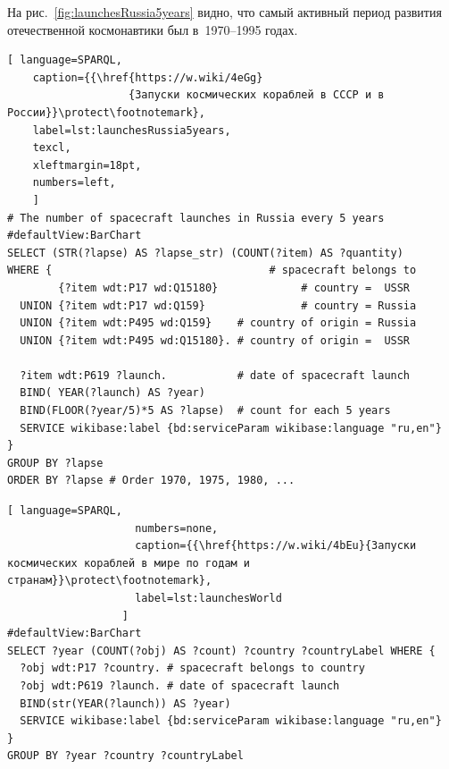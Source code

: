 На рис.~\ref{fig:launchesRussia5years} видно, 
что самый активный период развития отечественной космонавтики был в~1970--1995 годах.



\newpage


\begin{lstlisting}[ language=SPARQL, 
    caption={{\href{https://w.wiki/4eGg}
                   {Запуски космических кораблей в СССР и в России}}\protect\footnotemark}, 
    label=lst:launchesRussia5years,
    texcl,
    xleftmargin=18pt, 
    numbers=left,
    ]
# The number of spacecraft launches in Russia every 5 years
#defaultView:BarChart
SELECT (STR(?lapse) AS ?lapse_str) (COUNT(?item) AS ?quantity)
WHERE {                                  # spacecraft belongs to
        {?item wdt:P17 wd:Q15180}             # country =  USSR
  UNION {?item wdt:P17 wd:Q159}               # country = Russia
  UNION {?item wdt:P495 wd:Q159}    # country of origin = Russia
  UNION {?item wdt:P495 wd:Q15180}. # country of origin =  USSR
  
  ?item wdt:P619 ?launch.           # date of spacecraft launch
  BIND( YEAR(?launch) AS ?year) 
  BIND(FLOOR(?year/5)*5 AS ?lapse)  # count for each 5 years
  SERVICE wikibase:label {bd:serviceParam wikibase:language "ru,en"}
} 
GROUP BY ?lapse
ORDER BY ?lapse # Order 1970, 1975, 1980, ...
\end{lstlisting}



\begin{lstlisting}[ language=SPARQL, 
                    numbers=none, 
                    caption={{\href{https://w.wiki/4bEu}{Запуски космических кораблей в мире по годам и странам}}\protect\footnotemark}, 
                    label=lst:launchesWorld
                  ]
#defaultView:BarChart
SELECT ?year (COUNT(?obj) AS ?count) ?country ?countryLabel WHERE {
  ?obj wdt:P17 ?country. # spacecraft belongs to country 
  ?obj wdt:P619 ?launch. # date of spacecraft launch
  BIND(str(YEAR(?launch)) AS ?year)
  SERVICE wikibase:label {bd:serviceParam wikibase:language "ru,en"}
}
GROUP BY ?year ?country ?countryLabel
\end{lstlisting}



